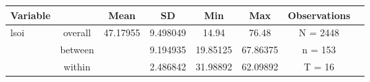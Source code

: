     {
    \def\sym#1{\ifmmode^{#1}\else\(^{#1}\)\fi}
    \begin{tabular}{l*{1}{ccccccc}}
    \hline\hline
    Variable &         & Mean     & SD & Min      & Max      & Observations \\
    \hline
    lsoi     & overall & 47.17955 & 9.498049  & 14.94    & 76.48    & N =    2448  \\
             & between &          & 9.194935  & 19.85125 & 67.86375 & n =     153  \\
             & within  &          & 2.486842  & 31.98892 & 62.09892 & T =      16 
    \end{tabular}
    }